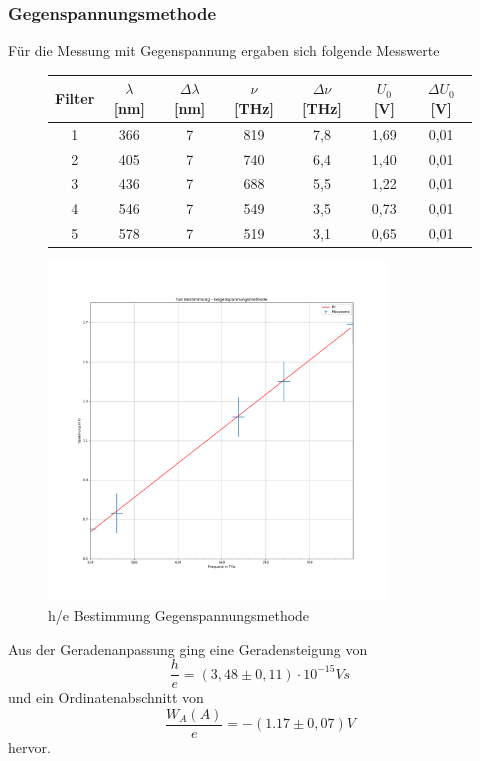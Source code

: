 \documentclass{scrartcl}
\begin{document}
		\subsubsection{Gegenspannungsmethode}
			Für die Messung mit Gegenspannung ergaben sich folgende Messwerte 
			\begin{figure}[H]
				\centering
				\begin{tabular}{|c|c|c|c|c|c|c|}
					\hline
					Filter & $\lambda$ [nm] & $\Delta\lambda$ [nm] & $\nu$ [THz] & $\Delta\nu$ [THz] & $U_0$ [V] & $\Delta U_0$ [V] \\
					
					\hline
					1 & 366 & 7 & 819 & 7,8 & 1,69 & 0,01\\
					2 & 405 & 7 & 740 & 6,4 & 1,40 & 0,01\\ 
					3 & 436 & 7 & 688 & 5,5 & 1,22 & 0,01\\
					4 & 546 & 7 & 549 & 3,5 & 0,73 & 0,01\\
					5 & 578 & 7 & 519 & 3,1 & 0,65 & 0,01\\
					\hline
				\end{tabular}
			\end{figure}
			\begin{figure}[H]
				\centering
				\includegraphics[width=0.8\textwidth]{he_gegenspannung.png}
				\caption{h/e Bestimmung Gegenspannungsmethode}
			\end{figure}
			Aus der Geradenanpassung ging eine Geradensteigung von 
			\begin{equation}
				\frac{h}{e} = (3,48\pm 0,11)\cdot 10^{-15}V s
			\end{equation}
			und ein Ordinatenabschnitt von
			\begin{equation}
				\frac{W_A(A)}{e} = -(1.17\pm 0,07)V
			\end{equation}
			hervor.
\end{document}
